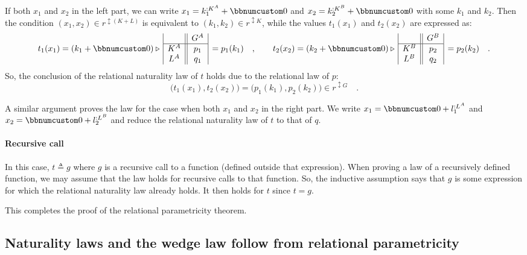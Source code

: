 If both $x_{1}$ and $x_{2}$ in the left part, we can write $x_{1}=k_{1}^{:K^{A}}+\bbnum 0$
and $x_{2}=k_{2}^{:K^{B}}+\bbnum 0$ with some $k_{1}$ and $k_{2}$.
Then the condition $(x_{1},x_{2})\in r^{\updownarrow(K+L)}$ is equivalent
to $(k_{1},k_{2})\in r^{\updownarrow K}$, while the values $t_{1}(x_{1})$
and $t_{2}(x_{2})$ are expressed as:
\[
t_{1}(x_{1})=(k_{1}+\bbnum 0)\triangleright\,\begin{array}{|c||c|}
 & G^{A}\\
\hline K^{A} & p_{1}\\
L^{A} & q_{1}
\end{array}\,=p_{1}(k_{1})\quad,\quad\quad t_{2}(x_{2})=(k_{2}+\bbnum 0)\triangleright\,\begin{array}{|c||c|}
 & G^{B}\\
\hline K^{B} & p_{2}\\
L^{B} & q_{2}
\end{array}\,=p_{2}(k_{2})\quad.
\]
So, the conclusion of the relational naturality law of $t$ holds
due to the relational law of $p$:
\[
\big(t_{1}(x_{1}),t_{2}(x_{2})\big)=\big(p_{1}(k_{1}),p_{2}(k_{2})\big)\in r^{\updownarrow G}\quad.
\]

A similar argument proves the law for the case when both $x_{1}$
and $x_{2}$ in the right part. We write $x_{1}=\bbnum 0+l_{1}^{:L^{A}}$
and $x_{2}=\bbnum 0+l_{2}^{:L^{B}}$ and reduce the relational naturality
law of $t$ to that of $q$.

\paragraph{Recursive call}

In this case, $t\triangleq g$ where $g$ is a recursive call to a
function (defined outside that expression). When proving a law of
a recursively defined function, we may assume that the law holds for
recursive calls to that function. So, the inductive assumption says
that $g$ is some expression for which the relational naturality law
already holds. It then holds for $t$ since $t=g$.

This completes the proof of the relational parametricity theorem.

\subsection{Naturality laws and the wedge law follow from relational parametricity}


